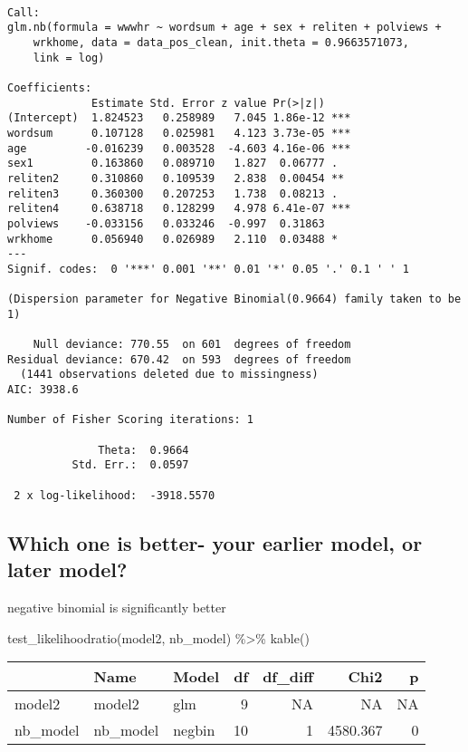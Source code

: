 \documentclass[
  letterpaper,
  DIV=11,
  numbers=noendperiod]{scrartcl}
\newenvironment{Shaded}{\begin{snugshade}}{\end{snugshade}}
\newcommand{\FunctionTok}[1]{\textcolor[rgb]{0.28,0.35,0.67}{#1}}
\newcommand{\NormalTok}[1]{\textcolor[rgb]{0.00,0.23,0.31}{#1}}
\newcommand{\SpecialCharTok}[1]{\textcolor[rgb]{0.37,0.37,0.37}{#1}}
\begin{document}
\begin{verbatim}

Call:
glm.nb(formula = wwwhr ~ wordsum + age + sex + reliten + polviews + 
    wrkhome, data = data_pos_clean, init.theta = 0.9663571073, 
    link = log)

Coefficients:
             Estimate Std. Error z value Pr(>|z|)    
(Intercept)  1.824523   0.258989   7.045 1.86e-12 ***
wordsum      0.107128   0.025981   4.123 3.73e-05 ***
age         -0.016239   0.003528  -4.603 4.16e-06 ***
sex1         0.163860   0.089710   1.827  0.06777 .  
reliten2     0.310860   0.109539   2.838  0.00454 ** 
reliten3     0.360300   0.207253   1.738  0.08213 .  
reliten4     0.638718   0.128299   4.978 6.41e-07 ***
polviews    -0.033156   0.033246  -0.997  0.31863    
wrkhome      0.056940   0.026989   2.110  0.03488 *  
---
Signif. codes:  0 '***' 0.001 '**' 0.01 '*' 0.05 '.' 0.1 ' ' 1

(Dispersion parameter for Negative Binomial(0.9664) family taken to be 1)

    Null deviance: 770.55  on 601  degrees of freedom
Residual deviance: 670.42  on 593  degrees of freedom
  (1441 observations deleted due to missingness)
AIC: 3938.6

Number of Fisher Scoring iterations: 1

              Theta:  0.9664 
          Std. Err.:  0.0597 

 2 x log-likelihood:  -3918.5570 
\end{verbatim}

\subsection{Which one is better- your earlier model, or later
model?}\label{which-one-is-better--your-earlier-model-or-later-model}

negative binomial is significantly better

\begin{Shaded}
\begin{Highlighting}[]
\FunctionTok{test\_likelihoodratio}\NormalTok{(model2, nb\_model) }\SpecialCharTok{\%\textgreater{}\%}
  \FunctionTok{kable}\NormalTok{()}
\end{Highlighting}
\end{Shaded}

\begin{longtable}[]{@{}lllrrrr@{}}
\toprule\noalign{}
& Name & Model & df & df\_diff & Chi2 & p \\
\midrule\noalign{}
\endhead
\bottomrule\noalign{}
\endlastfoot
model2 & model2 & glm & 9 & NA & NA & NA \\
nb\_model & nb\_model & negbin & 10 & 1 & 4580.367 & 0 \\
\end{longtable}
\end{document}

